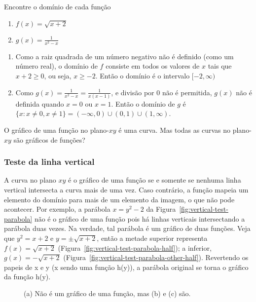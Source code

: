  Encontre o domínio de cada função
\vspace{-0.3cm}\begin{multicols}{2}
  \begin{enumerate}[label=(\alph*)]
    \item $\displaystyle f(x) = \sqrt{x+2}$
    \item $\displaystyle g(x)=\frac{1}{x^2-x}$
  \end{enumerate}
\end{multicols}
\vspace{-0.3cm}\solution 
\begin{enumerate}[label=(\alph*)]
  \item Como a raiz quadrada de um número negativo não é definido (como um número real), o domínio de $f$ consiste em todos os valores de $x$ tais que $x+2 \geq 0$, ou seja, $x \geq -2$. Então o domínio é o intervalo $[-2,\infty)$
  \item Como $\displaystyle g(x)=\frac{1}{x^2-x}=\frac{1}{x(x-1)}$, e divisão por 0 não é permitida, $g(x)$ não é definida quando $x=0$ ou $x=1$. Então o domínio de $g$ é $\{x:x\neq 0, x\neq 1\}=(-\infty,0)\cup(0,1)\cup(1,\infty)$.
\end{enumerate}

O gráfico de uma função no plano-$xy$ é uma curva. Mas todas as curvas no plano-$xy$ são gráficos de funções?
\vspace{-0.3cm}
\subsubsection{Teste da linha vertical}

A curva no plano $xy$ é o gráfico de uma função se e somente se nenhuma linha vertical intersecta a curva mais de uma vez. Caso contrário, a função mapeia um elemento do domínio para mais de um elemento da imagem, o que não pode acontecer. Por exemplo, a parábola $x = y^2-2$ da Figura~\ref{fig:vertical-test-parabola} não é o gráfico de uma função pois há linhas verticais intersectando a parábola duas vezes. Na verdade, tal parábola é um gráfico de duas funções. Veja que $y^2=x+2$ e $y=\pm\sqrt{x+2}$, então a metade superior representa $f(x) = \sqrt{x+2}$ (Figura~\ref{fig:vertical-test-parabola-half}); a inferior, $g(x)=-\sqrt{x+2}$ (Figura~\ref{fig:vertical-test-parabola-other-half}). Revertendo os papeis de x e y (x sendo uma função h(y)), a parábola original se torna o gráfico da função h(y).
\vspace{-0.6cm}\begin{figure}[!ht]
	\centering
	\caption{(a) Não é um gráfico de uma função, mas (b) e (c) são.}
  \vspace{-0.5cm}
\end{figure}

